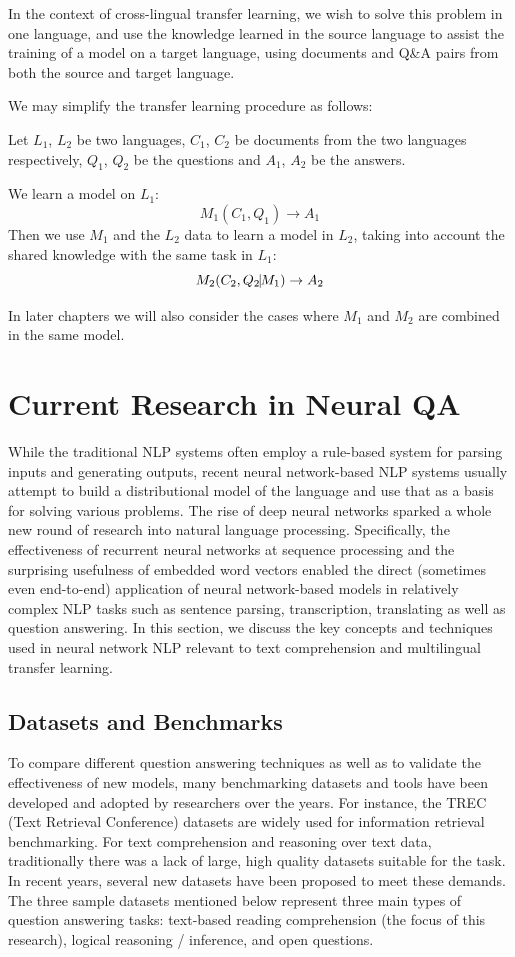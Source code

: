 \documentclass[]{article}
\begin{document}
In the context of cross-lingual transfer learning, we wish to solve this problem in one language, and use the knowledge learned in the source language to assist the training of a model on a target language, using documents and Q\&A pairs from both the source and target language.

We may simplify the transfer learning procedure as follows:

Let $L_1$, $L_2$ be two languages, $C_1$, $C_2$ be documents from the two languages respectively, $Q_1$, $Q_2$ be the questions and $A_1$, $A_2$ be the answers.

We learn a model on $L_1$:
\[  M_1(C_1, Q_1) \to A_1\]
Then we use $M_1$ and the $L_2$ data to learn a model in $L_2$, taking into account the shared knowledge with the same task in $L_1$:
\[  M_2(C_2, Q_2 \vline M_1) \to A_2\]

In later chapters we will also consider the cases where $M_1$ and $M_2$ are combined in the same model.


\section{Current Research in Neural QA}

While the traditional NLP systems often employ a rule-based system for parsing inputs and generating outputs, recent neural network-based NLP systems usually attempt to build a distributional model of the language and use that as a basis for solving various problems. The rise of deep neural networks sparked a whole new round of research into natural language processing. Specifically, the effectiveness of recurrent neural networks at sequence processing and the surprising usefulness of embedded word vectors enabled the direct (sometimes even end-to-end) application of neural network-based models in relatively complex NLP tasks such as sentence parsing, transcription, translating as well as question answering. In this section, we discuss the key concepts and techniques used in neural network NLP relevant to text comprehension and multilingual transfer learning.

\subsection{Datasets and Benchmarks}

To compare different question answering techniques as well as to validate the effectiveness of new models, many benchmarking datasets and tools have been developed and adopted by researchers over the years. For instance, the TREC (Text Retrieval Conference) datasets are widely used for information retrieval benchmarking. For text comprehension and reasoning over text data, traditionally there was a lack of large, high quality datasets suitable for the task. In recent years, several new datasets have been proposed to meet these demands. The three sample datasets mentioned below represent three main types of question answering tasks: text-based reading comprehension (the focus of this research), logical reasoning / inference, and open questions.
\end{document}

